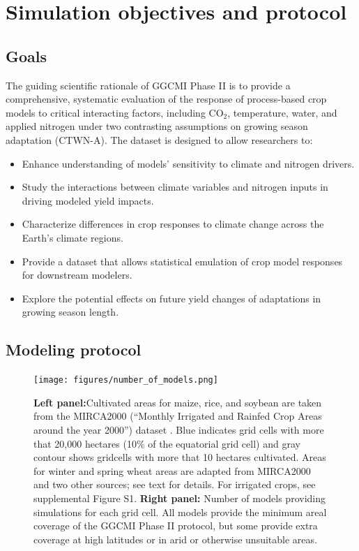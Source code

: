 \documentclass[gmd, manuscript]{copernicus} %
\begin{document}
\section{Simulation objectives and protocol}
\label{S:2}
\subsection{Goals}

The guiding scientific rationale of GGCMI Phase II is to provide a comprehensive, systematic evaluation of the response of process-based crop models to critical interacting factors, including CO$_2$, temperature, water, and applied nitrogen under two contrasting assumptions on growing season adaptation (CTWN-A). 
The dataset is designed to allow researchers to:
\begin{itemize}
    \item Enhance understanding of models’ sensitivity to climate and nitrogen drivers.
    \item Study the interactions between climate variables and nitrogen inputs in driving modeled yield impacts. 
    \item Characterize differences in crop responses to climate change across the Earth's climate regions.
    \item Provide a dataset that allows statistical emulation of crop model responses for downstream modelers.
    \item Explore the potential effects on future yield changes of adaptations in growing season length.
\end{itemize}
\vspace{-0.05in}

\subsection{Modeling protocol}
\begin{figure}[ht]
  \centering
  \texttt{[image: figures/number\_of\_models.png]}
  \caption{
  \textbf{Left panel:}Cultivated areas for maize, rice, and soybean are taken from the MIRCA2000 (``Monthly Irrigated and Rainfed Crop Areas around the year 2000'') dataset \citep{Portmann2010}. Blue indicates grid cells with more that 20,000 hectares (10\% of the equatorial grid cell) and gray contour shows gridcells with more that 10 hectares cultivated. 
  Areas for winter and spring wheat areas are adapted from MIRCA2000 and two other sources; see text for details.  For irrigated crops, see supplemental Figure S1.
  \textbf{Right panel:} Number of models providing simulations for each grid cell.  
  All models provide the minimum areal coverage of the GGCMI Phase II protocol, but some provide extra coverage at high latitudes or in arid or otherwise unsuitable areas.}
  \label{fig:crop_area}
\end{figure}
\end{document}

